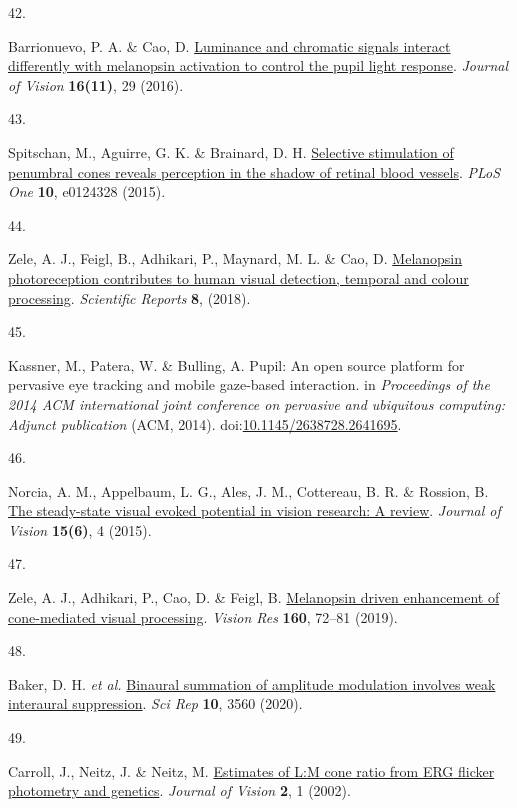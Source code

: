 \documentclass[
]{article}
\newlength{\cslhangindent}
\newlength{\csllabelwidth}
\newenvironment{CSLReferences}[2] %
 {\begin{list}{}{%
  \setlength{\itemindent}{0pt}
  \setlength{\leftmargin}{0pt}
  \setlength{\parsep}{0pt}
  \ifodd #1
   \setlength{\leftmargin}{\cslhangindent}
   \setlength{\itemindent}{-1\cslhangindent}
  \fi
  \setlength{\itemsep}{#2\baselineskip}}}
 {\end{list}}
\newcommand{\CSLLeftMargin}[1]{\parbox[t]{\csllabelwidth}{\strut#1\strut}}
\newcommand{\CSLRightInline}[1]{\parbox[t]{\linewidth - \csllabelwidth}{\strut#1\strut}}
\begin{document}
\begin{CSLReferences}{0}{0}
\CSLLeftMargin{42. }%
\CSLRightInline{Barrionuevo, P. A. \& Cao, D. \href{https://doi.org/10.1167/16.11.29}{Luminance and chromatic signals interact differently with melanopsin activation to control the pupil light response}. \emph{Journal of Vision} \textbf{16(11)}, 29 (2016).}

\CSLLeftMargin{43. }%
\CSLRightInline{Spitschan, M., Aguirre, G. K. \& Brainard, D. H. \href{https://doi.org/10.1371/journal.pone.0124328}{Selective stimulation of penumbral cones reveals perception in the shadow of retinal blood vessels}. \emph{PLoS One} \textbf{10}, e0124328 (2015).}

\CSLLeftMargin{44. }%
\CSLRightInline{Zele, A. J., Feigl, B., Adhikari, P., Maynard, M. L. \& Cao, D. \href{https://doi.org/10.1038/s41598-018-22197-w}{Melanopsin photoreception contributes to human visual detection, temporal and colour processing}. \emph{Scientific Reports} \textbf{8}, (2018).}

\CSLLeftMargin{45. }%
\CSLRightInline{Kassner, M., Patera, W. \& Bulling, A. Pupil: An open source platform for pervasive eye tracking and mobile gaze-based interaction. in \emph{Proceedings of the 2014 {ACM} international joint conference on pervasive and ubiquitous computing: Adjunct publication} ({ACM}, 2014). doi:\href{https://doi.org/10.1145/2638728.2641695}{10.1145/2638728.2641695}.}

\CSLLeftMargin{46. }%
\CSLRightInline{Norcia, A. M., Appelbaum, L. G., Ales, J. M., Cottereau, B. R. \& Rossion, B. \href{https://doi.org/10.1167/15.6.4}{The steady-state visual evoked potential in vision research: A review}. \emph{Journal of Vision} \textbf{15(6)}, 4 (2015).}

\CSLLeftMargin{47. }%
\CSLRightInline{Zele, A. J., Adhikari, P., Cao, D. \& Feigl, B. \href{https://doi.org/10.1016/j.visres.2019.04.009}{Melanopsin driven enhancement of cone-mediated visual processing}. \emph{Vision Res} \textbf{160}, 72--81 (2019).}

\CSLLeftMargin{48. }%
\CSLRightInline{Baker, D. H. \emph{et al.} \href{https://doi.org/10.1038/s41598-020-60602-5}{Binaural summation of amplitude modulation involves weak interaural suppression}. \emph{Sci Rep} \textbf{10}, 3560 (2020).}

\CSLLeftMargin{49. }%
\CSLRightInline{Carroll, J., Neitz, J. \& Neitz, M. \href{https://doi.org/10.1167/2.8.1}{Estimates of {L}:{M} cone ratio from {ERG} flicker photometry and genetics}. \emph{Journal of Vision} \textbf{2}, 1 (2002).}


\end{CSLReferences}
\end{document}
